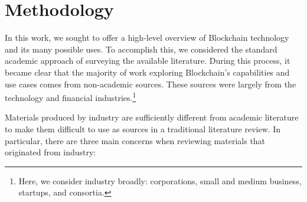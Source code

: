 
\section{Methodology}
\label{sec:method}

In this work, we sought to offer a high-level overview of Blockchain technology and its many possible uses.  To accomplish this, we considered the standard academic approach of surveying the available literature. During this process, it became clear that the majority of work exploring Blockchain's capabilities and use cases comes from non-academic sources. These sources were largely from the technology and financial industries.\footnote{Here, we consider industry broadly: corporations, small and medium business, startups, and consortia.}

Materials produced by industry are sufficiently different from academic literature to make them difficult to use as sources in a traditional literature review.
In particular, there are three main concerns when reviewing materials that originated from industry:


